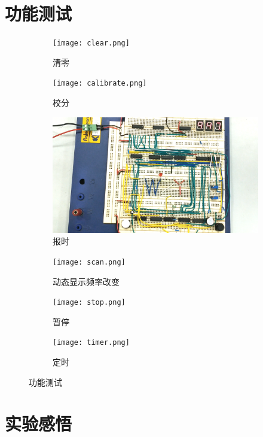 \documentclass{article}
\newcounter{sub}
\begin{document}
\section{功能测试}%
\label{sec:功能测试}

\begin{figure}[H]
	\centering
	\begin{subfigure}[htpb]{.45\linewidth}
		\centering
		\texttt{[image: clear.png]}
		\caption{清零}
		\label{fig:清零}
	\end{subfigure}
	\quad
	\begin{subfigure}[htpb]{.45\linewidth}
		\centering
		\texttt{[image: calibrate.png]}
		\caption{校分}
		\label{fig:校分}
	\end{subfigure}
	\quad
	\begin{subfigure}[htpb]{.45\linewidth}
		\centering
		\includegraphics[width=\linewidth]{alarm.png}
		\caption{报时}
		\label{fig:报时}
	\end{subfigure}
	\quad
	\begin{subfigure}[htpb]{.45\linewidth}
		\centering
		\texttt{[image: scan.png]}
		\caption{动态显示频率改变}
		\label{fig:动态显示频率改变}
	\end{subfigure}
	\quad
	\begin{subfigure}[htpb]{.45\linewidth}
		\centering
		\texttt{[image: stop.png]}
		\caption{暂停}
		\label{fig:暂停}
	\end{subfigure}
	\quad
	\begin{subfigure}[htpb]{.45\linewidth}
		\centering
		\texttt{[image: timer.png]}
		\caption{定时}
		\label{fig:定时}
	\end{subfigure}
	\caption{功能测试}
	\label{fig:功能测试}
\end{figure}

\newpage

\section{实验感悟}%
\label{sec:实验感悟}
\end{document}
